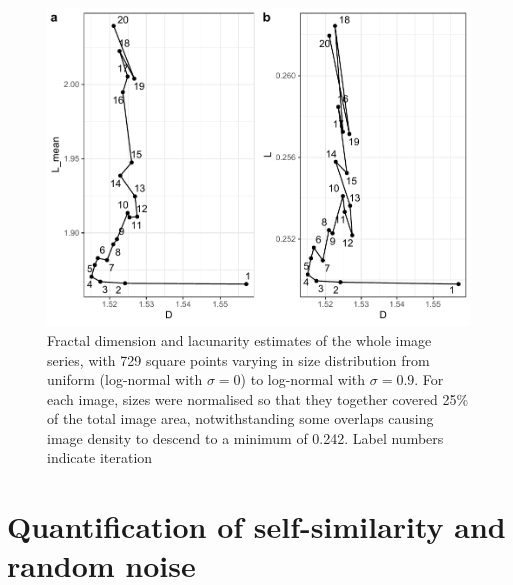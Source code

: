 \documentclass[
  12pt,
  a4paper, twoside]{book}
\begin{document}
\begin{figure}

{\centering \includegraphics[width=0.9\linewidth]{bookdown-demo_files/figure-latex/08-distr-1} 

}

\caption[D and L estimates, variable size distribution of elements]{Fractal dimension and lacunarity estimates of the whole image series, with 729 square points varying in size distribution from uniform (log-normal with \(\sigma = 0\)) to log-normal with \(\sigma = 0.9\). For each image, sizes were normalised so that they together covered 25\% of the total image area, notwithstanding some overlaps causing image density to descend to a minimum of 0.242. Label numbers indicate iteration}\label{fig:08-distr}
\end{figure}

\FloatBarrier

\hypertarget{quantification-of-self-similarity-and-random-noise}{%
\section{Quantification of self-similarity and random noise}\label{quantification-of-self-similarity-and-random-noise}}
\end{document}
